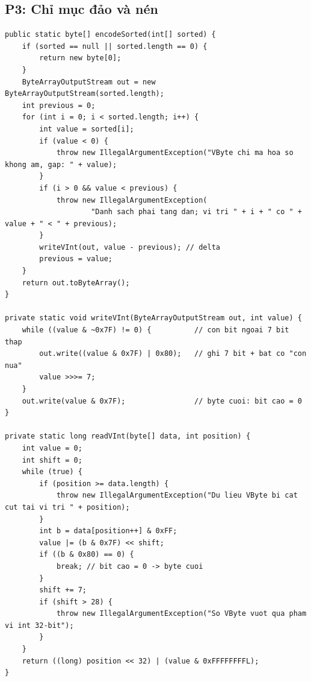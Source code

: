 \documentclass[9pt,twocolumn,a4paper]{extarticle}
\newcommand{\code}[1]{\texttt{#1}}
\begin{document}
\subsection{P3: Chỉ mục đảo và nén}
\begin{minipage}{\linewidth}
\begin{lstlisting}[caption={\code{index/VByteCodec.java}, \code{encodeSorted}, \code{writeVInt}, \code{readVInt}: delta và VByte},label={lst:vbyte}]
public static byte[] encodeSorted(int[] sorted) {
    if (sorted == null || sorted.length == 0) {
        return new byte[0];
    }
    ByteArrayOutputStream out = new ByteArrayOutputStream(sorted.length);
    int previous = 0;
    for (int i = 0; i < sorted.length; i++) {
        int value = sorted[i];
        if (value < 0) {
            throw new IllegalArgumentException("VByte chi ma hoa so khong am, gap: " + value);
        }
        if (i > 0 && value < previous) {
            throw new IllegalArgumentException(
                    "Danh sach phai tang dan; vi tri " + i + " co " + value + " < " + previous);
        }
        writeVInt(out, value - previous); // delta
        previous = value;
    }
    return out.toByteArray();
}

private static void writeVInt(ByteArrayOutputStream out, int value) {
    while ((value & ~0x7F) != 0) {          // con bit ngoai 7 bit thap
        out.write((value & 0x7F) | 0x80);   // ghi 7 bit + bat co "con nua"
        value >>>= 7;
    }
    out.write(value & 0x7F);                // byte cuoi: bit cao = 0
}

private static long readVInt(byte[] data, int position) {
    int value = 0;
    int shift = 0;
    while (true) {
        if (position >= data.length) {
            throw new IllegalArgumentException("Du lieu VByte bi cat cut tai vi tri " + position);
        }
        int b = data[position++] & 0xFF;
        value |= (b & 0x7F) << shift;
        if ((b & 0x80) == 0) {
            break; // bit cao = 0 -> byte cuoi
        }
        shift += 7;
        if (shift > 28) {
            throw new IllegalArgumentException("So VByte vuot qua pham vi int 32-bit");
        }
    }
    return ((long) position << 32) | (value & 0xFFFFFFFFL);
}
\end{lstlisting}
\end{minipage}
\par\vspace{4pt}
\end{document}
